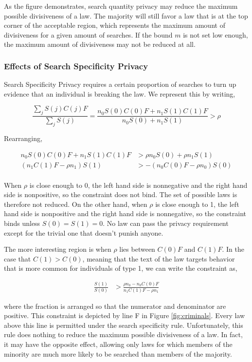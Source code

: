 As the figure demonstrates, search quantity privacy may reduce the maximum possible divisiveness of a law.  The majority will still favor a law that is at the top corner of the acceptable region, which represents the maximum amount of divisiveness for a given amount of searches.  If the bound $m$ is not set low enough, the maximum amount of divisiveness may not be reduced at all.

\subsubsection{Effects of Search Specificity Privacy}

Search Specificity Privacy requires a certain proportion of searches to turn up evidence that an individual is breaking the law.  We represent this by writing,

$$\frac{\sum_j S(j)C(j)F}{\sum_j S(j)} = \frac{ n_0 S(0)C(0)F + n_1 S(1)C(1)F}{n_0 S(0) + n_1 S(1)}  > \rho$$

Rearranging,

\begin{align}
\nonumber n_0 S(0)C(0)F + n_1 S(1)C(1)F &> \rho n_0 S(0) + \rho n_1 S(1) \\
\nonumber  (n_1 C(1)F - \rho n_1 ) S(1) &>  - (n_0 C(0)F - \rho n_0 )S(0) \\
\end{align}

When $\rho$ is close enough to 0, the left hand side is nonnegative and the right hand side is nonpositive, so the constraint does not bind.  The set of possible laws is therefore not reduced.  On the other hand, when $\rho$ is close enough to 1, the left hand side is nonpositive and the right hand side is nonnegative, so the constraint binds unless $S(0) = S(1) = 0$.  No law can pass the privacy requirement except for the trivial one that doesn't punish anyone.  

The more interesting region is when $\rho$ lies between  $C(0)F$ and $C(1)F$.  In the case that $C(1) > C(0)$, meaning that the text of the law targets behavior that is more common for individuals of type 1, we can write the constraint as,

\begin{align}
\frac{S(1)}{S(0)} &>  \frac{\rho n_0 - n_0 C(0)F }{n_1 C(1)F - \rho n_1}
\end{align}

where the fraction is arranged so that the numerator and denominator are positive.  This constraint is depicted by line F in Figure \ref{fig:criminals}.  Every law above this line is permitted under the search specificity rule.  Unfortunately, this rule does nothing to reduce the maximum possible divisiveness of a law.  In fact, it may have the opposite effect, allowing only laws for which members of the minority are much more likely to be searched than members of the majority.

